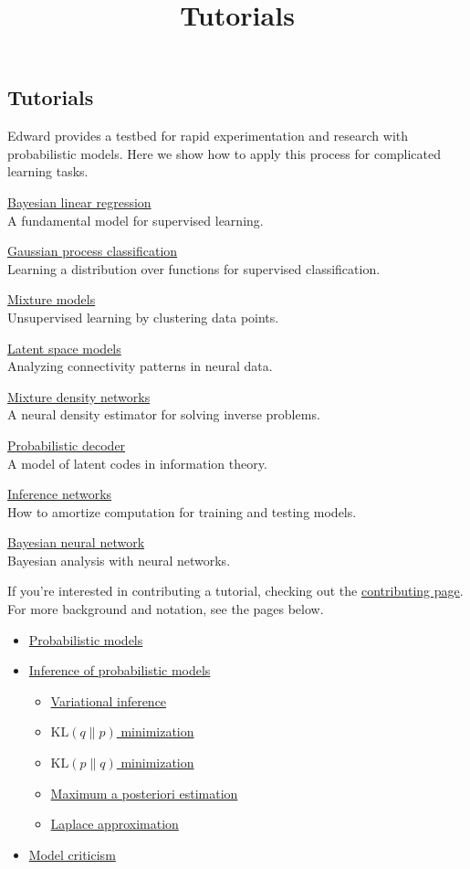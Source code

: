 \title{Tutorials}

\subsection{Tutorials}

Edward provides a testbed for rapid experimentation and research with
probabilistic models. Here we show how to apply this process for
complicated learning tasks.

\href{supervised-regression}{Bayesian linear regression} \\
A fundamental model for supervised learning.

\href{supervised-classification}{Gaussian process classification} \\
Learning a distribution over functions for supervised classification.

\href{unsupervised}{Mixture models} \\
Unsupervised learning by clustering data points.

\href{latent-space-models}{Latent space models} \\
Analyzing connectivity patterns in neural data.

\href{mixture-density-network}{Mixture density networks} \\
A neural density estimator for solving inverse problems.


\href{decoder}{Probabilistic decoder} \\
A model of latent codes in information theory.

\href{inference-networks}{Inference networks} \\
How to amortize computation for training and testing models.

\href{bayesian-neural-network}{Bayesian neural network} \\
Bayesian analysis with neural networks.

If you're interested in contributing a tutorial, checking out the
\href{/contributing}{contributing page}.
For more background and notation, see the pages below.
\begin{itemize}
  \item \href{model}{Probabilistic models}
  \item \href{inference}{Inference of probabilistic models}
  \begin{itemize}
   \item \href{variational-inference}{Variational inference}
   \item \href{klqp}{$\text{KL}(q\|p)$ minimization}
   \item \href{klpq}{$\text{KL}(p\|q)$ minimization}
   \item \href{map}{Maximum a posteriori estimation}
   \item \href{map-laplace}{Laplace approximation}
  \end{itemize}
  \item \href{criticism}{Model criticism}
\end{itemize}

